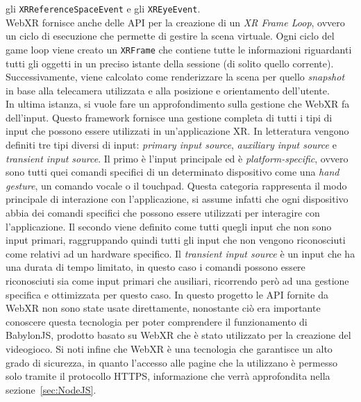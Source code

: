 gli \texttt{XRReferenceSpaceEvent} e gli \texttt{XREyeEvent}.\\
WebXR fornisce anche delle API per la creazione di un \textit{XR Frame Loop}, ovvero un ciclo di esecuzione che permette di gestire la scena virtuale. Ogni
ciclo del game loop viene creato un \texttt{XRFrame} che contiene tutte le informazioni riguardanti tutti gli oggetti in un preciso istante della sessione (di solito quello corrente).
Successivamente, viene calcolato come renderizzare la scena per quello \textit{snapshot} in base alla telecamera utilizzata e alla posizione e orientamento dell'utente.\\
\newline
In ultima istanza, si vuole fare un approfondimento sulla gestione che WebXR fa dell'input. Questo framework fornisce una gestione completa di tutti i tipi di input che possono
essere utilizzati in un'applicazione XR. In letteratura vengono definiti tre tipi diversi di input: \textit{primary input source}, \textit{auxiliary input source} e \textit{transient
input source}. Il primo è l'input principale ed è \textit{platform-specific}, ovvero sono tutti quei comandi specifici di un determinato dispositivo come una \textit{hand gesture},
un comando vocale o il touchpad. Questa categoria rappresenta il modo principale di interazione con l'applicazione, si assume infatti che ogni dispositivo abbia dei comandi specifici
che possono essere utilizzati per interagire con l'applicazione. Il secondo viene definito come tutti quegli input che non sono input primari, raggruppando quindi tutti gli input
che non vengono riconosciuti come relativi ad un hardware specifico. Il \textit{transient input source} è un input che ha una durata di tempo limitato, in questo caso i comandi
possono essere riconosciuti sia come input primari che ausiliari, ricorrendo però ad una gestione specifica e ottimizzata per questo caso.
\newline \newline
In questo progetto le API fornite da WebXR non sono state usate direttamente, nonostante ciò era importante conoscere questa tecnologia per poter comprendere il funzionamento
di BabylonJS, prodotto basato su WebXR che è stato utilizzato per la creazione del videogioco. Si noti infine che WebXR è una tecnologia che garantisce un alto grado di sicurezza, in quanto
l'accesso alle pagine che la utilizzano è permesso solo tramite il protocollo HTTPS, informazione che verrà approfondita nella sezione~\ref{sec:NodeJS}. 

